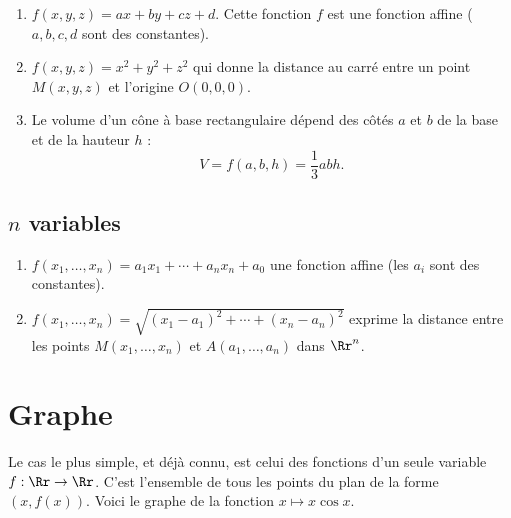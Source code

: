 \documentclass[11pt,class=report,crop=false]{standalone}
\begin{document}
\begin{exemple}
\sauteligne
\begin{enumerate}
  \item $f(x,y,z) = ax+by+cz+d$. Cette fonction $f$ est une fonction affine ($a,b,c,d$ sont des constantes).
   \item $f(x,y,z) = x^2+y^2+z^2$ qui donne la distance au carré entre un point $M(x,y,z)$ et l'origine $O(0,0,0)$.
   \item Le volume d'un cône à base rectangulaire dépend des côtés $a$ et $b$ de la base et de la hauteur $h$ :
   $$V = f(a,b,h) = \frac13 abh.$$
   
     
\end{enumerate}
\end{exemple}


\subsection{$n$ variables}

\begin{exemple}
\sauteligne
\begin{enumerate}
  \item $f(x_1,\ldots,x_n) = a_1x_1+\cdots+a_nx_n+a_0$ une fonction affine (les $a_i$ sont des constantes).
  \item $f(x_1,\ldots,x_n) = \sqrt{(x_1-a_1)^2+\cdots+(x_n-a_n)^2}$ exprime la distance entre les points $M(x_1,\ldots,x_n)$ et $A(a_1,\ldots,a_n)$ dans $\Rr^n$.
\end{enumerate}
\end{exemple}


\section{Graphe}

Le cas le plus simple, et déjà connu, est celui des fonctions d'un seule variable $f : \Rr \rightarrow \Rr$.  C'est l'ensemble de tous les points du plan de la forme $(x,f(x))$. Voici le graphe de la fonction $x \mapsto x\cos x$.




\end{document}
